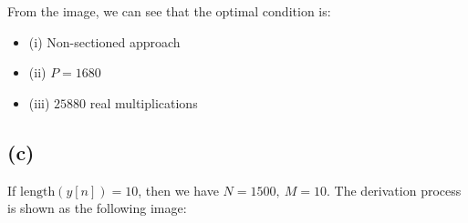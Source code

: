 \documentclass{article}
\begin{document}
From the image, we can see that the optimal condition is: 
\begin{itemize}
    \item (i) Non-sectioned approach
    \item (ii) $P = 1680$
    \item (iii) $25880$ real multiplications
\end{itemize}











\subsection*{(c)}

If $\mathrm{length}(y[n]) = 10$, then we have $N = 1500, \ M = 10$.
The derivation process is shown as the following image:
\end{document}
